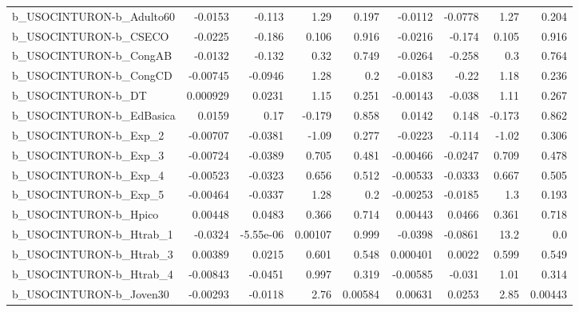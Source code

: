 \begin{tabular}{lrrrrrrrr}
b\_USOCINTURON-b\_Adulto60   &     -0.0153 &       -0.113 &     1.29 &    0.197 &    -0.0112 &     -0.0778 &         1.27 &         0.204 \\
b\_USOCINTURON-b\_CSECO      &     -0.0225 &       -0.186 &    0.106 &    0.916 &    -0.0216 &      -0.174 &        0.105 &         0.916 \\
b\_USOCINTURON-b\_CongAB     &     -0.0132 &       -0.132 &     0.32 &    0.749 &    -0.0264 &      -0.258 &          0.3 &         0.764 \\
b\_USOCINTURON-b\_CongCD     &    -0.00745 &      -0.0946 &     1.28 &      0.2 &    -0.0183 &       -0.22 &         1.18 &         0.236 \\
b\_USOCINTURON-b\_DT         &    0.000929 &       0.0231 &     1.15 &    0.251 &   -0.00143 &      -0.038 &         1.11 &         0.267 \\
b\_USOCINTURON-b\_EdBasica   &      0.0159 &         0.17 &   -0.179 &    0.858 &     0.0142 &       0.148 &       -0.173 &         0.862 \\
b\_USOCINTURON-b\_Exp\_2      &    -0.00707 &      -0.0381 &    -1.09 &    0.277 &    -0.0223 &      -0.114 &        -1.02 &         0.306 \\
b\_USOCINTURON-b\_Exp\_3      &    -0.00724 &      -0.0389 &    0.705 &    0.481 &   -0.00466 &     -0.0247 &        0.709 &         0.478 \\
b\_USOCINTURON-b\_Exp\_4      &    -0.00523 &      -0.0323 &    0.656 &    0.512 &   -0.00533 &     -0.0333 &        0.667 &         0.505 \\
b\_USOCINTURON-b\_Exp\_5      &    -0.00464 &      -0.0337 &     1.28 &      0.2 &   -0.00253 &     -0.0185 &          1.3 &         0.193 \\
b\_USOCINTURON-b\_Hpico      &     0.00448 &       0.0483 &    0.366 &    0.714 &    0.00443 &      0.0466 &        0.361 &         0.718 \\
b\_USOCINTURON-b\_Htrab\_1    &     -0.0324 &    -5.55e-06 &  0.00107 &    0.999 &    -0.0398 &     -0.0861 &         13.2 &           0.0 \\
b\_USOCINTURON-b\_Htrab\_3    &     0.00389 &       0.0215 &    0.601 &    0.548 &   0.000401 &      0.0022 &        0.599 &         0.549 \\
b\_USOCINTURON-b\_Htrab\_4    &    -0.00843 &      -0.0451 &    0.997 &    0.319 &   -0.00585 &      -0.031 &         1.01 &         0.314 \\
b\_USOCINTURON-b\_Joven30    &    -0.00293 &      -0.0118 &     2.76 &  0.00584 &    0.00631 &      0.0253 &         2.85 &       0.00443 \\

\end{tabular}
